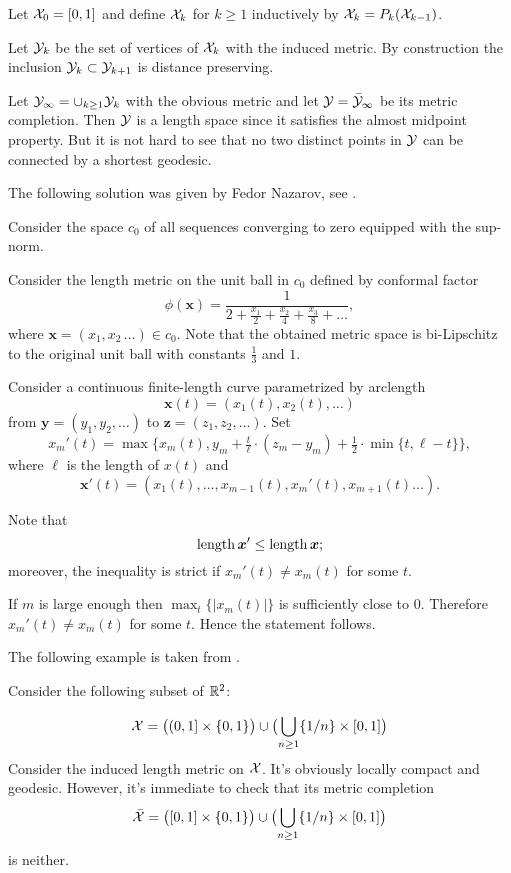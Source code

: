 Let $\mathcal{X}_0=[0,1]$ and define $\mathcal{X}_k$ for $k\ge 1$ inductively by $\mathcal{X}_k=P_k(\mathcal{X}_{k-1})$.

Let $\mathcal{Y}_k$ be the set of vertices of $\mathcal{X}_k$ with the induced metric. By construction the inclusion $\spc{Y}_k\subset \spc{Y}_{k+1}$ is distance preserving.

Let $\spc{Y}_\infty=\cup_{k\ge 1}\spc{Y}_k$ with the obvious metric and let $\mathcal{Y}=\bar {\mathcal{Y}}_\infty$ be its metric completion. Then $\mathcal{Y}$ is a length space since it satisfies the almost midpoint property. But it is not hard to see that no two distinct points in $\mathcal{Y}$ can be connected by a shortest geodesic. \qeds


The following solution was given by Fedor Nazarov, see \cite{nazarov}.

Consider the space $c_0$ of all sequences converging to zero equipped with the sup-norm.

Consider the length metric on the unit ball in $c_0$ defined by 
conformal factor
\[\phi(\bm{x})=\frac1{2+\frac{x_1}2+\frac{x_2}4+\frac{x_3}8+\dots},\]
where $\bm{x}=(x_1,x_2\,\dots)\in c_0$.
Note that the obtained metric space is bi-Lipschitz to the original unit ball with constants $\tfrac{1}{3}$ and $1$.


Consider a continuous finite-length curve parametrized by arclength 
\[\bm{x}(t)=(x_1(t),x_2(t),\dots)\] 
from $\bm{y}=(y_1,y_2,\dots)$ to $\bm{z}=(z_1,z_2,\dots)$.
Set
\[x_m'(t)=\max\{x_m(t),y_m+\tfrac t\ell\cdot (z_m-y_m)+\tfrac 12\cdot \min\{t,\ell-t\}\},\] 
where $\ell$ is the length of $x(t)$
and
\[\bm{x}'(t)=(x_1(t),\dots,x_{m-1}(t),x_m'(t), x_{m+1}(t)\dots).\]

Note that 
\[\length \bm{x}'\le \length \bm{x};\]
moreover, the inequality is strict if $x_m'(t)\ne x_m(t)$ for some $t$.

If $m$ is large enough then $\max_t\{|x_m(t)|\}$ is sufficiently close to $0$.
Therefore $x_m'(t)\ne x_m(t)$ for some $t$.
Hence the statement follows.
\qeds

The following example is taken from \cite{BH}.

\medskip

Consider the following subset of $\mathbb{R}^2$:

\[
\spc{X}
=
\bigl((0,1]\times\{0,1\}\bigr)
\cup
\bigl(\bigcup_{n\ge 1}\{1/n\}\times[0,1]\bigr)
\]
Consider the induced length metric on $\mathcal{X}$. It's obviously locally compact and geodesic.
However, it's immediate to check that its metric completion \[\bar{\spc{X}}
=
\bigl([0,1]\times\{0,1\}\bigr)
\cup
\bigl(\bigcup_{n\ge 1}\{1/n\}\times[0,1]\bigr)\] 
is neither. \qeds 

